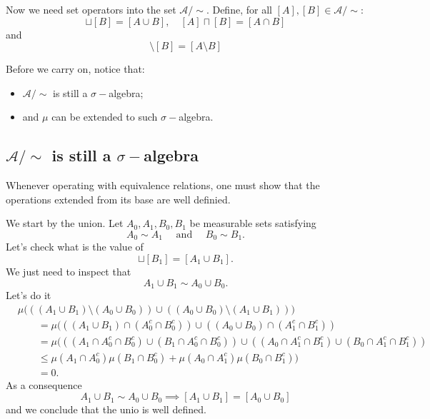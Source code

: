 \documentclass[11pt,twoside,a4paper]{article}
\begin{document}
Now we need set operators into the set $\mathcal{A}/\sim$.
Define, for all $[A], [B] \in \mathcal{A}/\sim $:
\begin{equation*}
   [A] \sqcup [B] = [A \cup B],
   \quad
   [A] \sqcap [B] = [A \cap B]
\end{equation*}
and
\begin{equation*}
    [A] \setminus [B] = [A \setminus B]
\end{equation*}

Before we carry on, notice that: 
\begin{itemize}
    \item  $\mathcal{A} / \sim$ is still a $\sigma-$algebra;    
    \item and $\mu$ can be extended to such $\sigma-$algebra.
\end{itemize}

\subsection{ $\mathcal{A} / \sim$ is still a $\sigma-$algebra }

Whenever operating with equivalence relations, one must show
that the operations extended from its base are well definied.

We start by the union.
Let $A_0, A_1, B_0, B_1$ be measurable sets satisfying
\begin{equation*}
    A_0 \sim A_1 \quad \text{ and } \quad B_0 \sim B_1.
\end{equation*}
Let's check what is the value of
\begin{equation*}
    [A_1] \sqcup [B_1] =  [A_1 \cup B_1].
\end{equation*}
We just need to inspect that
\begin{equation*}
    A_1 \cup B_1 \sim A_0 \cup B_0.
\end{equation*}
Let's do it
\begin{align*}
    &\mu\Big( ((A_1 \cup B_1) \setminus ( A_0 \cup B_0) )  \cup  
       ((A_0 \cup B_0) \setminus ( A_1 \cup B_1) ) \Big)\\
	&\qquad=
        \mu( ((A_1 \cup B_1) \cap ( A_0^c \cap B_0^c) ) \cup  
           ((A_0 \cup B_0) \cap ( A_1^c \cap B_1^c) )\\
	&\qquad=
        \mu( ((A_1 \cap A_0^c \cap B_0^c) \cup (B_1 \cap A_0^c \cap B_0^c))
           \cup
           ((A_0 \cap A_1^c \cap B_1^c) \cup (B_0 \cap A_1^c \cap B_1^c))\\
    & \qquad \leq
        \mu( A_1 \cap A_0^c) \mu (B_1 \cap B_0^c)
        +
        \mu (A_0 \cap A_1^c) \mu(B_0 \cap B_1^c))\\
	& \qquad =
        0.
\end{align*}
As a consequence
    \begin{equation*}
    A_1 \cup B_1 \sim A_0 \cup B_0 \implies
    [A_1 \cup B_1] = [ A_0 \cup B_0 ]
    \end{equation*}
and we conclude that the unio is well defined.
\end{document}
